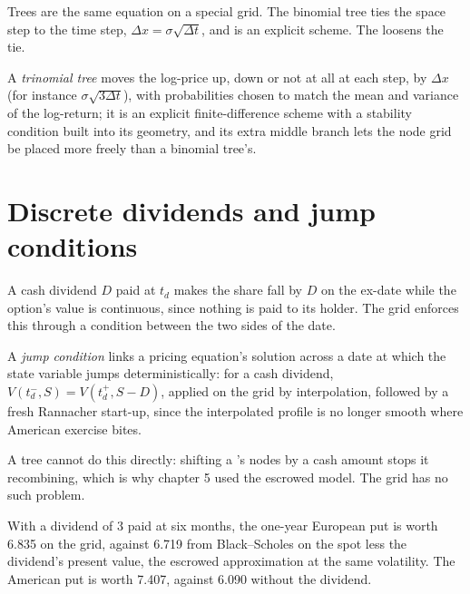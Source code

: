 Trees are the same equation on a special grid. The binomial tree ties the space step to the time step, $\Delta x=\sigma\sqrt{\Delta t}$,
and is an explicit scheme. The  loosens the tie.

\begin{definition}\label{def:dv:trees-and-finite-difference-pricers-in-practice:trinomial}
A \emph{trinomial tree} moves the log-price up, down or not at all at each step, by $\Delta x$ (for instance
$\sigma\sqrt{3\Delta t}$), with probabilities chosen to match the mean and variance of the log-return; it is an explicit finite-difference
scheme with a stability condition built into its geometry, and its extra middle branch lets the node grid be placed more freely than a
binomial tree's.
\end{definition}

\section{Discrete dividends and jump conditions}

A cash dividend $D$ paid at $t_d$ makes the share fall by $D$ on the ex-date while the option's value is continuous, since nothing is
paid to its holder. The grid enforces this through a condition between the two sides of the date.

\begin{definition}\label{def:dv:trees-and-finite-difference-pricers-in-practice:jump}
A \emph{jump condition} links a pricing equation's solution across a date at which the state variable jumps
deterministically: for a cash dividend, $V(t_d^-,S)=V(t_d^+,S-D)$, applied on the grid by interpolation, followed by a fresh Rannacher
start-up, since the interpolated profile is no longer smooth where American exercise bites.
\end{definition}

A tree cannot do this directly: shifting a 's nodes by a cash amount stops it recombining, which is why chapter 5 used the
escrowed model. The grid has no such problem.

\begin{example}\label{ex:dv:trees-and-finite-difference-pricers-in-practice:dividend}
With a dividend of 3 paid at six months, the one-year European put is worth 6.835 on the grid, against 6.719 from Black--Scholes on the spot
less the dividend's present value, the escrowed approximation at the same volatility. The American put is worth 7.407, against 6.090
without the dividend.
\end{example}

